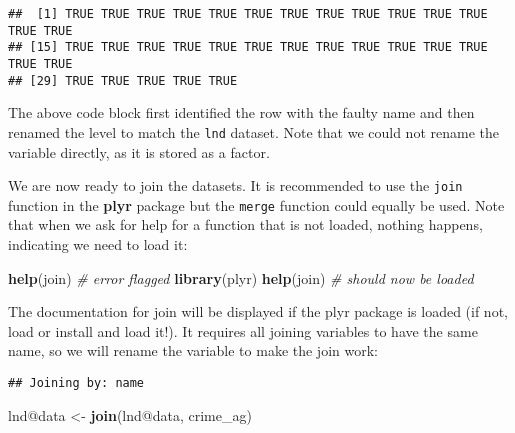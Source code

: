 \documentclass[]{article}
\newenvironment{Shaded}{}{}
\newcommand{\KeywordTok}[1]{\textcolor[rgb]{0.00,0.44,0.13}{\textbf{{#1}}}}
\newcommand{\DataTypeTok}[1]{\textcolor[rgb]{0.56,0.13,0.00}{{#1}}}
\newcommand{\StringTok}[1]{\textcolor[rgb]{0.25,0.44,0.63}{{#1}}}
\newcommand{\CommentTok}[1]{\textcolor[rgb]{0.38,0.63,0.69}{\textit{{#1}}}}
\newcommand{\NormalTok}[1]{{#1}}
\begin{document}
\begin{verbatim}
##  [1] TRUE TRUE TRUE TRUE TRUE TRUE TRUE TRUE TRUE TRUE TRUE TRUE TRUE TRUE
## [15] TRUE TRUE TRUE TRUE TRUE TRUE TRUE TRUE TRUE TRUE TRUE TRUE TRUE TRUE
## [29] TRUE TRUE TRUE TRUE TRUE
\end{verbatim}

The above code block first identified the row with the faulty name and
then renamed the level to match the \texttt{lnd} dataset. Note that we
could not rename the variable directly, as it is stored as a factor.

We are now ready to join the datasets. It is recommended to use the
\texttt{join} function in the \textbf{plyr} package but the
\texttt{merge} function could equally be used. Note that when we ask for
help for a function that is not loaded, nothing happens, indicating we
need to load it:

\begin{Shaded}
\begin{Highlighting}[]
\KeywordTok{help}\NormalTok{(join) }\CommentTok{# error flagged}
\KeywordTok{library}\NormalTok{(plyr)}
\KeywordTok{help}\NormalTok{(join) }\CommentTok{# should now be loaded}
\end{Highlighting}
\end{Shaded}

The documentation for join will be displayed if the plyr package is
loaded (if not, load or install and load it!). It requires all joining
variables to have the same name, so we will rename the variable to make
the join work:

\begin{Shaded}
\end{Shaded}

\begin{verbatim}
## Joining by: name
\end{verbatim}

\begin{Shaded}
\begin{Highlighting}[]
\NormalTok{lnd@data <-}\StringTok{ }\KeywordTok{join}\NormalTok{(lnd@data, crime_ag)}
\end{Highlighting}
\end{Shaded}
\end{document}

